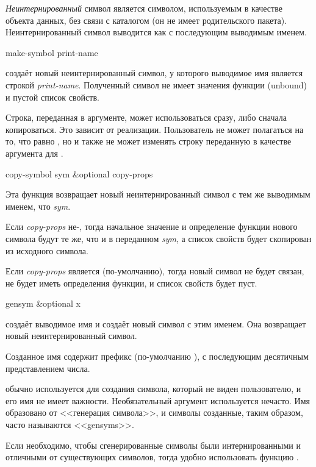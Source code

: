 \emph{Неинтернированный} символ является символом, используемым в качестве
объекта данных, без связи с каталогом (он не имеет родительского пакета).
Неинтернированный символ выводится как \cd{\#:} с последующим выводимым именем.

\begin{defun}[Функция]
make-symbol print-name

 создаёт новый неинтернированный символ, у
которого выводимое имя является строкой \emph{print-name}. Полученный символ не
имеет значения функции (unbound) и пустой список свойств.

Строка, переданная в аргументе, может использоваться сразу, либо сначала
копироваться. Это зависит от реализации.
Пользователь не может полагаться на то, что  равно  , но и также не может изменять строку
переданную в качестве аргумента для .
\end{defun}

\begin{defun}[Функция]
copy-symbol sym &optional copy-props

Эта функция возвращает новый неинтернированный символ с тем же выводимым именем,
что \emph{sym}.

Если \emph{copy-props} не-{\nil}, тогда начальное значение и определение функции
нового символа будут те же, что и в переданном \emph{sym}, а список свойств будет
скопирован из исходного символа.

Если \emph{copy-props} является {\nil} (по-умолчанию), тогда новый символ не
будет связан, не будет иметь определения функции, и список свойств будет пуст.
\end{defun}

\begin{defun}[Функция]
gensym &optional x

 создаёт выводимое имя и создаёт новый символ с этим именем.
Она возвращает новый неинтернированный символ.

Созданное имя содержит префикс (по-умолчанию ), с последующим десятичным
представлением числа.

 обычно используется для создания символа, который не виден
пользователю, и его имя не имеет важности.
Необязательный аргумент используется нечасто. Имя образовано от <<генерация
символа>>, и символы созданные, таким образом, часто называются <<gensyms>>.

Если необходимо, чтобы сгенерированные символы были интернированными и отличными
от существующих символов, тогда удобно использовать функцию .
\end{defun}

